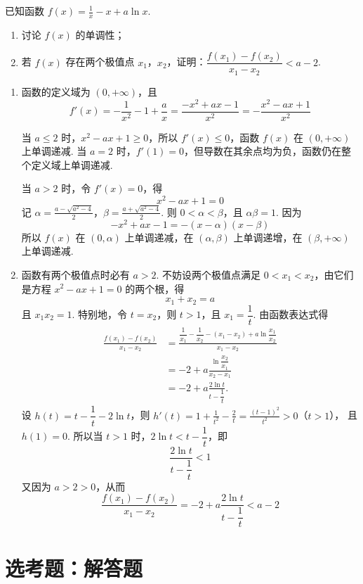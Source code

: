 \begin{problem}
已知函数 \(f(x)=\frac1x-x+a\ln x\).

\begin{enumerate}
\item 讨论 \(f(x)\) 的单调性；
\item 若 \(f(x)\) 存在两个极值点 \(x_1\)，\(x_2\)，证明：\(\dfrac{f(x_1)-f(x_2)}{x_1-x_2}<a-2\).
\end{enumerate}
\end{problem}

\begin{solution}
\begin{enumerate}
\item 函数的定义域为 \((0,+\infty)\)，且
\[
f'(x)=-\frac1{x^2}-1+\frac ax=\frac{-x^2+ax-1}{x^2}=-\frac{x^2-ax+1}{x^2}
\]

当 \(a\le2\) 时，\(x^2-ax+1\ge0\)，所以 \(f'(x)\le0\)，函数 \(f(x)\) 在 \((0,+\infty)\) 上单调递减. 当 \(a=2\) 时，\(f'(1)=0\)，但导数在其余点均为负，函数仍在整个定义域上单调递减.

当 \(a>2\) 时，令 \(f'(x)=0\)，得
\[
x^2-ax+1=0
\]
记
\(\alpha=\frac{a-\sqrt{a^2-4}}{2}\)，\(\beta=\frac{a+\sqrt{a^2-4}}{2}\).
则 \(0<\alpha<\beta\)，且 \(\alpha\beta=1\). 因为
\[
-x^2+ax-1=-(x-\alpha)(x-\beta)
\]
所以 \(f(x)\) 在 \((0,\alpha)\) 上单调递减，在 \((\alpha,\beta)\) 上单调递增，在 \((\beta,+\infty)\) 上单调递减.

\item 函数有两个极值点时必有 \(a>2\). 不妨设两个极值点满足 \(0<x_1<x_2\)，由它们是方程 \(x^2-ax+1=0\) 的两个根，得
\[
x_1+x_2=a
\]
且 \(x_1x_2=1\).
特别地，令 \(t=x_2\)，则 \(t>1\)，且 \(x_1=\dfrac1t\). 由函数表达式得
\[
\begin{aligned}
\frac{f(x_1)-f(x_2)}{x_1-x_2}
&=\frac{\dfrac1{x_1}-\dfrac1{x_2}-(x_1-x_2)+a\ln\dfrac{x_1}{x_2}}{x_1-x_2}\\
&=-2+a\frac{\ln\dfrac{x_2}{x_1}}{x_2-x_1}\\
&=-2+a\frac{2\ln t}{t-\dfrac1t}.
\end{aligned}
\]
设 \(h(t)=t-\dfrac1t-2\ln t\)，则
\(h'(t)=1+\frac1{t^2}-\frac2t=\frac{(t-1)^2}{t^2}>0\)（\(t>1\)），
且 \(h(1)=0\).
所以当 \(t>1\) 时，\(2\ln t<t-\dfrac1t\)，即
\[
\frac{2\ln t}{t-\dfrac1t}<1
\]
又因为 \(a>2>0\)，从而
\[
\frac{f(x_1)-f(x_2)}{x_1-x_2}=-2+a\frac{2\ln t}{t-\dfrac1t}<a-2
\]
\end{enumerate}
\end{solution}

\section{选考题：解答题}

